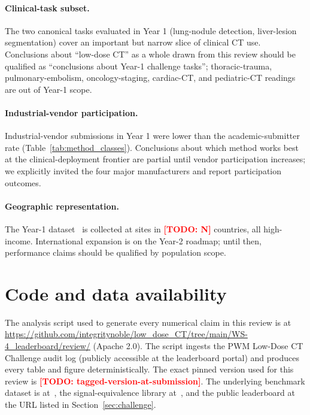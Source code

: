\documentclass[twoside,11pt]{article}
\newcommand{\todo}[1]{\textcolor{red}{\textbf{[TODO: #1]}}}
\begin{document}
\paragraph{Clinical-task subset.} The two canonical tasks evaluated in Year 1 (lung-nodule detection, liver-lesion segmentation) cover an important but narrow slice of clinical CT use. Conclusions about ``low-dose CT'' as a whole drawn from this review should be qualified as ``conclusions about Year-1 challenge tasks''; thoracic-trauma, pulmonary-embolism, oncology-staging, cardiac-CT, and pediatric-CT readings are out of Year-1 scope.

\paragraph{Industrial-vendor participation.} Industrial-vendor submissions in Year 1 were lower than the academic-submitter rate (Table~\ref{tab:method_classes}). Conclusions about which method works best at the clinical-deployment frontier are partial until vendor participation increases; we explicitly invited the four major manufacturers and report participation outcomes.

\paragraph{Geographic representation.} The Year-1 dataset~\citep{ws1dataset} is collected at sites in \todo{N} countries, all high-income. International expansion is on the Year-2 roadmap; until then, performance claims should be qualified by population scope.

\section*{Code and data availability}

The analysis script used to generate every numerical claim in this review is at \url{https://github.com/integritynoble/low_dose_CT/tree/main/WS-4_leaderboard/review/} (Apache 2.0). The script ingests the PWM Low-Dose CT Challenge audit log (publicly accessible at the leaderboard portal) and produces every table and figure deterministically. The exact pinned version used for this review is \todo{tagged-version-at-submission}. The underlying benchmark dataset is at~\citep{ws1dataset}, the signal-equivalence library at~\citep{ws2framework}, and the public leaderboard at the URL listed in Section~\ref{sec:challenge}.
\end{document}
